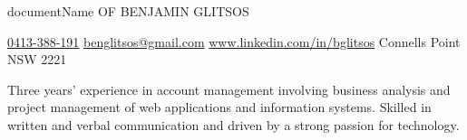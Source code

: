 \documentclass{resume}
\begin{document}
\h{{{documentName}} OF BENJAMIN GLITSOS}

\begin{center}
    \href{tel:0413-388-191}{0413-388-191} \textbar{} \href{mailto:benglitsos@gmail.com}{benglitsos@gmail.com} \textbar{} \href{https://www.linkedin.com/in/bglitsos/}{www.linkedin.com/in/bglitsos} \textbar{} Connells Point NSW 2221
\end{center}


\begin{center}
    Three years' experience in account management involving business analysis and project management of web applications and information systems. Skilled in written and verbal communication and driven by a strong passion for technology.
\end{center}

\end{document}
